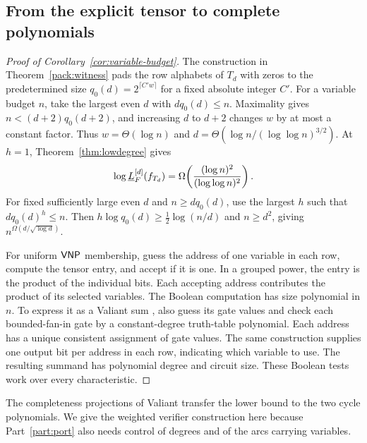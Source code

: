 \subsection{From the explicit tensor to complete polynomials}

\begin{proof}[Proof of Corollary~\ref{cor:variable-budget}]
The construction in Theorem~\ref{pack:witness} pads the row alphabets
of $T_d$ with zeros to the predetermined size
$q_0(d)=2^{\lceil C'w\rceil}$ for a fixed absolute integer $C'$.
For a variable budget $n$, take the largest even $d$ with
$d q_0(d)\le n$. Maximality gives $n<(d+2)q_0(d+2)$, and increasing
$d$ to $d+2$ changes $w$ by at most a constant factor. Thus
$w=\Theta(\log n)$ and
$d=\Theta(\log n/(\log\log n)^{3/2})$. At $h=1$,
Theorem~\ref{thm:lowdegree} gives
\begin{equation}\label{eq:vnphard}
   \log \underline L_F^{[d]}(f_{T_d})
        =\Omega\!\left(\frac{(\log n)^2}{(\log\log n)^2}\right).
\end{equation}
For fixed sufficiently large even $d$ and $n\ge d q_0(d)$, use the
largest $h$ such that $d q_0(d)^h\le n$. Then
$h\log q_0(d)\ge\tfrac12\log(n/d)$ and $n\ge d^2$, giving
$n^{\Omega(d/\sqrt{\log d})}$.

For uniform $\mathsf{VNP}$ membership, guess the address of one variable in
each row, compute the tensor entry, and accept if it is one. In a
grouped power, the entry is the product of the individual bits. Each
accepting address contributes the product of its selected variables.
The Boolean computation has size polynomial in $n$. To express it
as a Valiant sum \cite{Valiant}, also guess its gate values and check
each bounded-fan-in gate by a constant-degree truth-table polynomial.
Each address has a unique consistent assignment of gate values.
The same construction supplies one output bit per address in each
row, indicating which variable to use. The resulting summand has
polynomial degree and circuit size. These Boolean tests work over
every characteristic.
\end{proof}

The completeness projections of Valiant \cite{Valiant,Burgisser}
transfer the lower bound to the two cycle polynomials. We give the
weighted verifier construction here because Part~\ref{part:port}
also needs control of degrees and of the arcs carrying variables.



